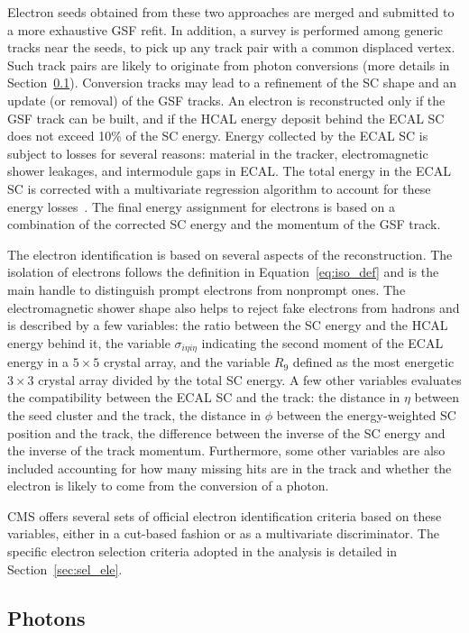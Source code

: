 Electron seeds obtained from these two approaches are merged and submitted to a more exhaustive GSF refit.
In addition, a survey is performed among generic tracks near the seeds, 
to pick up any track pair with a common displaced vertex.
Such track pairs are likely to originate from photon conversions (more details in Section~\ref{sec:reco_phot}).
Conversion tracks may lead to a refinement of the SC shape and an update (or removal) of the GSF tracks.
An electron is reconstructed only if the GSF track can be built, 
and if the HCAL energy deposit behind the ECAL SC does not exceed 10\% of the SC energy.
Energy collected by the ECAL SC is subject to losses for several reasons:
material in the tracker, electromagnetic shower leakages, and intermodule gaps in ECAL.
The total energy in the ECAL SC is corrected with a multivariate regression algorithm to account for these energy losses~\cite{Khachatryan_2014}.
The final energy assignment for electrons is based on a combination of 
the corrected SC energy and the momentum of the GSF track.

The electron identification is based on several aspects of the reconstruction.
The isolation of electrons follows the definition in Equation~\ref{eq:iso_def} 
and is the main handle to distinguish prompt electrons from nonprompt ones.
The electromagnetic shower shape also helps to reject fake electrons from hadrons 
and is described by a few variables: 
the ratio between the SC energy and the HCAL energy behind it,
the variable $\sigma_{i\eta{}i\eta}$ indicating the second moment of the ECAL energy in a $5 \times 5$ crystal array,
and the variable $R_{9}$ defined as the most energetic $3 \times 3$ crystal array divided by the total SC energy.
A few other variables evaluates the compatibility between the ECAL SC and the track:
the distance in $\eta$ between the seed cluster and the track,
the distance in $\phi$ between the energy-weighted SC position and the track,
the difference between the inverse of the SC energy and the inverse of the track momentum. 
Furthermore, some other variables are also included accounting for how many missing hits are in the track 
and whether the electron is likely to come from the conversion of a photon.

CMS offers several sets of official electron identification criteria based on these variables,
either in a cut-based fashion or as a multivariate discriminator.
The specific electron selection criteria adopted in the \hmm analysis is detailed in Section~\ref{sec:sel_ele}. 

\subsection{Photons}\label{sec:reco_phot}

